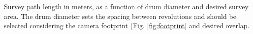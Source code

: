 \label{fig:survey_length} Survey path length in meters, as a function of drum diameter and desired survey area. The drum diameter sets the spacing between revolutions and should be selected considering the camera footprint (Fig. \ref{fig:footprint} and desired overlap.